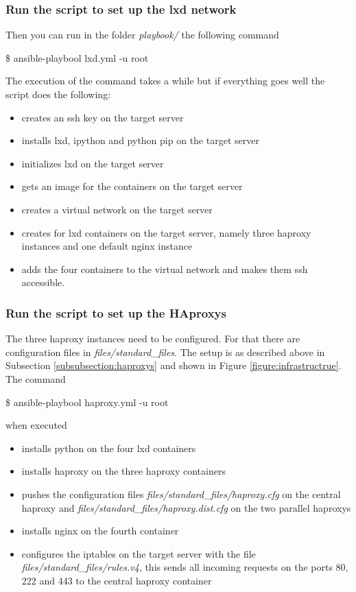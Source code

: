 \subsubsection{Run the script to set up the lxd network}
 Then you can run in the folder \textit{playbook/} the following command
\begin{tcolorbox}
\$	ansible-playbool lxd.yml -u root
\end{tcolorbox}

The execution of the command takes a while but if everything goes well the script does the following:
\begin{itemize}
	\item creates an ssh key on the target server
	\item installs lxd, ipython and python pip on the target server
	\item initializes lxd on the target server
	\item gets an image for the containers on the target server
	\item creates a virtual network on the target server
	\item creates for lxd containers on the target server, namely three haproxy instances and one default nginx instance
	\item adds the four containers to the virtual network and makes them ssh accessible.
\end{itemize}

\subsubsection{Run the script to set up the HAproxys}
The three haproxy instances need to be configured. For that there are configuration files in \textit{files/standard\_files}. The setup is as described above in Subsection \ref{subsubsection:haproxys} and shown in Figure \ref{figure:infrastructrue}. The command
\begin{tcolorbox}
\$	ansible-playbool haproxy.yml -u root
\end{tcolorbox}
when executed
\begin{itemize}
	\item installs python on the four lxd containers
	\item installs haproxy on the three haproxy containers
	\item pushes the configuration files \textit{files/standard\_files/haproxy.cfg} on the central haproxy and \textit{files/standard\_files/haproxy.dist.cfg} on the two parallel haproxys
	\item installs nginx on the fourth container
	\item configures the iptables on the target server with the file \textit{files/standard\_files/rules.v4}, this sends all incoming requests on the ports 80, 222 and 443 to the central haproxy container
\end{itemize}